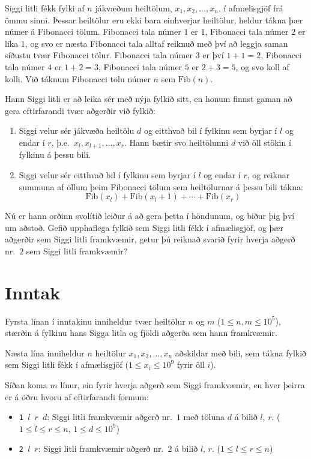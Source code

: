 Siggi litli fékk fylki af $n$ jákvæðum heiltölum, $x_1, x_2, \ldots, x_n$, í afmælisgjöf frá ömmu sinni.
Þessar heiltölur eru ekki bara einhverjar heiltölur, heldur tákna þær númer
á Fibonacci tölum. Fibonacci tala númer $1$ er $1$, Fibonacci tala númer $2$ er
líka $1$, og svo er næsta Fibonacci tala alltaf reiknuð með því að leggja saman
síðustu tvær Fibonacci tölur. Fibonacci tala númer $3$ er því $1+1=2$,
Fibonacci tala númer $4$ er $1+2 = 3$, Fibonacci tala númer $5$ er $2+3=5$, og
svo koll af kolli. Við táknum Fibonacci tölu númer $n$ sem $\mathrm{Fib}(n)$.

Hann Siggi litli er að leika sér með nýja fylkið sitt, en honum finnst gaman að
gera eftirfarandi tvær aðgerðir við fylkið:
\begin{enumerate}
    \item Siggi velur sér jákvæða heiltölu $d$ og eitthvað bil í fylkinu sem
        byrjar í $l$ og endar í $r$, þ.e.\ $x_l, x_{l+1}, \ldots, x_{r}$. Hann bætir svo
        heiltölunni $d$ við öll stökin í fylkinu á þessu bili.
    \item Siggi velur sér eitthvað bil í fylkinu sem byrjar í $l$ og endar í
        $r$, og reiknar summuna af öllum þeim Fibonacci tölum sem heiltölurnar
        á þessu bili tákna:
        \[
            \mathrm{Fib}(x_l) + \mathrm{Fib}(x_l+1) + \cdots + \mathrm{Fib}(x_r)
        \]
\end{enumerate}

Nú er hann orðinn svolítið leiður á að gera þetta í höndunum, og biður þig því
um aðstoð. Gefið upphaflega fylkið sem Siggi litli fékk í afmælisgjöf, og þær
aðgerðir sem Siggi litli framkvæmir, getur þú reiknað svarið fyrir hverja
aðgerð nr.\ $2$ sem Siggi litli framkvæmir?

\section*{Inntak}
Fyrsta línan í inntakinu inniheldur tvær heiltölur $n$ og $m$ ($1 \leq n, m \leq
10^5$), stærðin á fylkinu hans Sigga litla og fjöldi aðgerða sem hann
framkvæmir.

Næsta lína inniheldur $n$ heiltölur $x_1,x_2,\ldots, x_n$ aðskildar með bili,
sem tákna fylkið sem Siggi litli fékk í afmælisgjöf ($1 \leq x_i\leq 10^9$
fyrir öll $i$).

Síðan koma $m$ línur, ein fyrir hverja aðgerð sem Siggi framkvæmir, en hver
þeirra er á öðru hvoru af eftirfarandi formum:
\begin{itemize}
    \item \texttt{1 $l$ $r$ $d$}: Siggi litli framkvæmir aðgerð nr.\ $1$ með töluna $d$ á bilið $l$, $r$. ($1 \leq l \leq r \leq n$, $1 \leq d \leq 10^9$)
    \item \texttt{2 $l$ $r$}: Siggi litli framkvæmir aðgerð nr.\ $2$ á bilið $l$, $r$. ($1 \leq l \leq r \leq n$)
\end{itemize}

